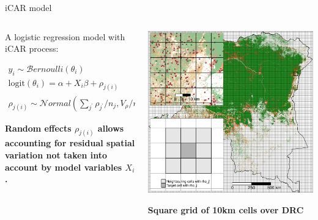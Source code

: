 \documentclass[10pt,table,dvipsnames,compress]{beamer}
\begin{document}
\begin{frame}[label={sec:orgd30ce3c}]{iCAR model}
\begin{columns}
\begin{column}{0.5\columnwidth}
A logistic regression model with iCAR process:

\begin{equation*}
\begin{split}
  y_i \sim \mathcal{B}ernoulli(\theta_i)\\
  \text{logit}(\theta_i) = \alpha + X_i \beta + \rho_{j(i)}\\
  \rho_{j(i)} \sim \mathcal{N}ormal(\sum_{j^{\prime}} \rho_{j^{\prime}} / n_j,V_{\rho} / n_j)
\end{split}
\end{equation*}

\textbf{Random effects \(\rho_{j(i)}\) allows accounting for residual spatial variation not taken into account by model variables \(X_i\).}
\end{column}

\begin{column}{0.5\columnwidth}
\begin{center}
\includegraphics[width=\textwidth]{figs/sm/grid.png}
\end{center}

\centering \textbf{Square grid of 10km cells over DRC}
\end{column}
\end{columns}
\end{frame}
\end{document}
